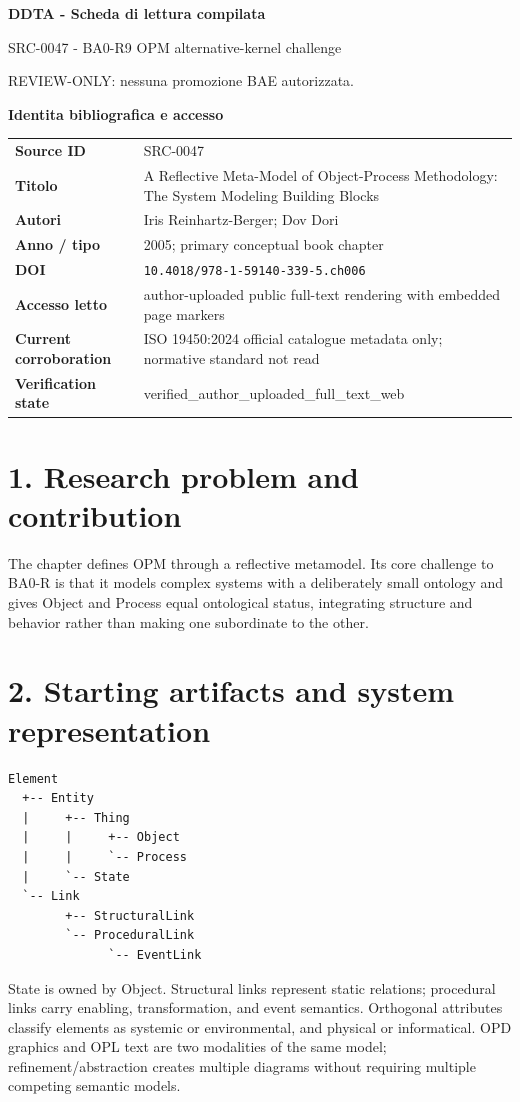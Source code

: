 \documentclass[10pt,a4paper]{article}
\newenvironment{factbox}[1]{\def\FrameCommand{\fcolorbox{ddtablue}{ddtagray}}\MakeFramed{\advance\hsize-2\width\FrameRestore}\noindent\textbf{#1}\par\smallskip}{\endMakeFramed}
\begin{document}
\begin{center}{\LARGE\bfseries DDTA - Scheda di lettura compilata}\par
{\large SRC-0047 - BA0-R9 OPM alternative-kernel challenge}\par
{\small REVIEW-ONLY: nessuna promozione BAE autorizzata.}\par\end{center}
\begin{factbox}{Identita bibliografica e accesso}
\begin{tabularx}{\linewidth}{>{\bfseries}p{3.6cm}X}
Source ID & SRC-0047\\
Titolo & A Reflective Meta-Model of Object-Process Methodology: The System Modeling Building Blocks\\
Autori & Iris Reinhartz-Berger; Dov Dori\\
Anno / tipo & 2005; primary conceptual book chapter\\
DOI & \texttt{10.4018/978-1-59140-339-5.ch006}\\
Accesso letto & author-uploaded public full-text rendering with embedded page markers\\
Current corroboration & ISO 19450:2024 official catalogue metadata only; normative standard not read\\
Verification state & verified\_author\_uploaded\_full\_text\_web\\
\end{tabularx}
\end{factbox}

\section{1. Research problem and contribution}
The chapter defines OPM through a reflective metamodel. Its core challenge to BA0-R is that it models complex systems with a deliberately small ontology and gives Object and Process equal ontological status, integrating structure and behavior rather than making one subordinate to the other.

\section{2. Starting artifacts and system representation}
\begin{verbatim}
Element
  +-- Entity
  |     +-- Thing
  |     |     +-- Object
  |     |     `-- Process
  |     `-- State
  `-- Link
        +-- StructuralLink
        `-- ProceduralLink
              `-- EventLink
\end{verbatim}
State is owned by Object. Structural links represent static relations; procedural links carry enabling, transformation, and event semantics. Orthogonal attributes classify elements as systemic or environmental, and physical or informatical. OPD graphics and OPL text are two modalities of the same model; refinement/abstraction creates multiple diagrams without requiring multiple competing semantic models.
\end{document}
